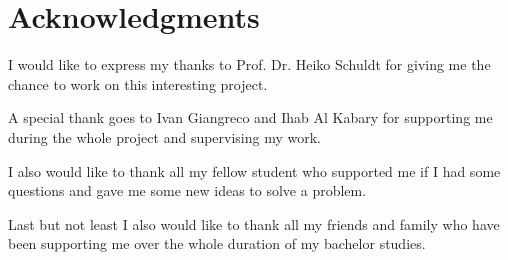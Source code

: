 \chapter{Acknowledgments}

I would like to express my thanks to Prof. Dr. Heiko Schuldt for giving me the chance to work on this interesting project.

A special thank goes to Ivan Giangreco and Ihab Al Kabary for supporting me during the whole project and supervising my work.

I also would like to thank all my fellow student who supported me if I had some questions and gave me some new ideas to solve a problem. 

Last but not least I also would like to thank all my friends and family who have been supporting me over the whole duration of my bachelor studies.

